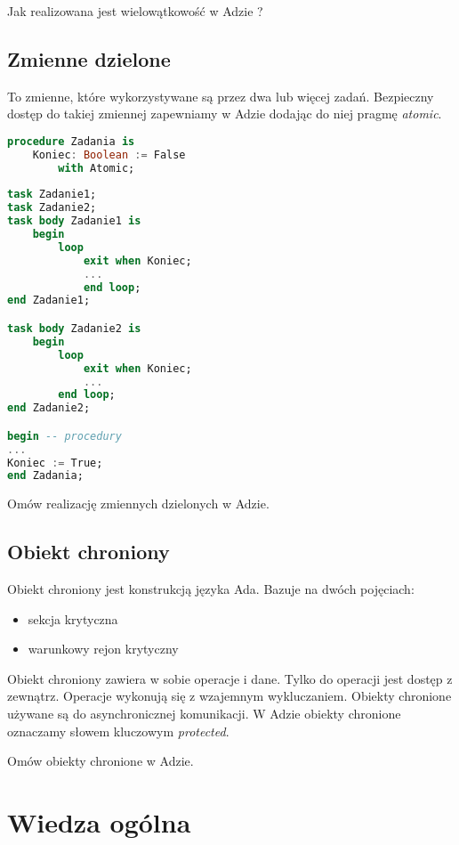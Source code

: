 \documentclass[a4paper,15pt]{article}
\newcommand{\ask}[2]{
    \begin{tcolorbox}[colback=black!5!white,colframe=gray,title={Pytanie #1}]
        #2
    \end{tcolorbox}
}
\begin{document}
\ask{}{
Jak realizowana jest wielowątkowość w Adzie ?
}

\subsection{Zmienne dzielone}
To zmienne, które wykorzystywane są przez dwa lub więcej zadań. Bezpieczny dostęp do takiej zmiennej zapewniamy w Adzie dodając do niej pragmę \textit{atomic}. 


\begin{lstlisting}[language=Ada]
procedure Zadania is
	Koniec: Boolean := False
		with Atomic;
		
task Zadanie1;
task Zadanie2;
task body Zadanie1 is
	begin
		loop
			exit when Koniec;
			...
			end loop;
end Zadanie1; 

task body Zadanie2 is
	begin
		loop
			exit when Koniec;
			...
		end loop;
end Zadanie2;

begin -- procedury
...
Koniec := True;
end Zadania;
\end{lstlisting}

\ask{}{
Omów realizację zmiennych dzielonych w Adzie.
}

\subsection{Obiekt chroniony}

Obiekt chroniony jest konstrukcją języka Ada. Bazuje na dwóch pojęciach:
\begin{itemize}
\item sekcja krytyczna
\item warunkowy rejon krytyczny
\end{itemize}
Obiekt chroniony zawiera w sobie operacje i dane. Tylko do operacji jest dostęp z zewnątrz. Operacje wykonują się z wzajemnym wykluczaniem. 
Obiekty chronione używane są do asynchronicznej komunikacji. W Adzie obiekty chronione oznaczamy słowem kluczowym \textit{protected}.

\ask{}{
Omów obiekty chronione w Adzie. 
}

\newpage
\section{Wiedza ogólna}
\end{document}
